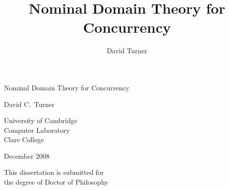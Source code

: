 \documentclass[oneside,draft,titlepage,a4paper]{book}
\title{Nominal Domain Theory for Concurrency}
\date{\revisionnumber}
\author{David Turner}
\begin{document}
\begin{titlepage}
\vspace*{1mm}
\begin{center}
\Huge Nominal Domain Theory for Concurrency
\end{center}
\addvspace{20mm}
\begin{center}
\LARGE David C.~Turner
\end{center}
\addvspace{20mm}
\begin{center}
\end{center}
\addvspace{23mm}
\begin{center}
\Large University of Cambridge\\
Computer Laboratory\\
Clare College
\end{center}
\addvspace{15mm}
\begin{center}\Large December 2008\end{center}
\addvspace{15mm}
\begin{center}
This dissertation is submitted for\\
the degree of Doctor of Philosophy
\end{center}
\end{titlepage}
\setcounter{page}{2} %
%
\pagestyle{empty}
\end{document}
